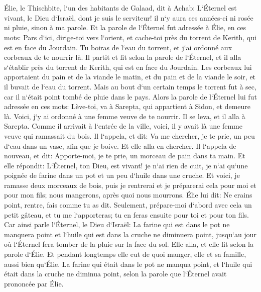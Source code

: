 \chapter{}

\verse Élie, le Thischbite, l`un des habitants de Galaad, dit à Achab: L`Éternel est vivant, le Dieu d`Israël, dont je suis le serviteur! il n`y aura ces années-ci ni rosée ni pluie, sinon à ma parole. 
\verse Et la parole de l`Éternel fut adressée à Élie, en ces mots: 
\verse Pars d`ici, dirige-toi vers l`orient, et cache-toi près du torrent de Kerith, qui est en face du Jourdain. 
\verse Tu boiras de l`eau du torrent, et j`ai ordonné aux corbeaux de te nourrir là. 
\verse Il partit et fit selon la parole de l`Éternel, et il alla s`établir près du torrent de Kerith, qui est en face du Jourdain. 
\verse Les corbeaux lui apportaient du pain et de la viande le matin, et du pain et de la viande le soir, et il buvait de l`eau du torrent. 
\verse Mais au bout d`un certain temps le torrent fut à sec, car il n`était point tombé de pluie dans le pays. 
\verse Alors la parole de l`Éternel lui fut adressée en ces mots: 
\verse Lève-toi, va à Sarepta, qui appartient à Sidon, et demeure là. Voici, j`y ai ordonné à une femme veuve de te nourrir. 
\verse Il se leva, et il alla à Sarepta. Comme il arrivait à l`entrée de la ville, voici, il y avait là une femme veuve qui ramassait du bois. Il l`appela, et dit: Va me chercher, je te prie, un peu d`eau dans un vase, afin que je boive. 
\verse Et elle alla en chercher. Il l`appela de nouveau, et dit: Apporte-moi, je te prie, un morceau de pain dans ta main. 
\verse Et elle répondit: L`Éternel, ton Dieu, est vivant! je n`ai rien de cuit, je n`ai qu`une poignée de farine dans un pot et un peu d`huile dans une cruche. Et voici, je ramasse deux morceaux de bois, puis je rentrerai et je préparerai cela pour moi et pour mon fils; nous mangerons, après quoi nous mourrons. 
\verse Élie lui dit: Ne crains point, rentre, fais comme tu as dit. Seulement, prépare-moi d`abord avec cela un petit gâteau, et tu me l`apporteras; tu en feras ensuite pour toi et pour ton fils. 
\verse Car ainsi parle l`Éternel, le Dieu d`Israël: La farine qui est dans le pot ne manquera point et l`huile qui est dans la cruche ne diminuera point, jusqu`au jour où l`Éternel fera tomber de la pluie sur la face du sol. 
\verse Elle alla, et elle fit selon la parole d`Élie. Et pendant longtemps elle eut de quoi manger, elle et sa famille, aussi bien qu`Élie. 
\verse La farine qui était dans le pot ne manqua point, et l`huile qui était dans la cruche ne diminua point, selon la parole que l`Éternel avait prononcée par Élie. 
